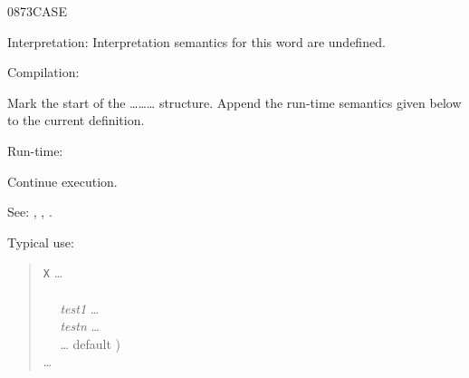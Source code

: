 \begin{newword*}{0873}{CASE}
\item[Interpretation:]
	Interpretation semantics for this word are undefined.

\item[Compilation:]

	Mark the start of the
	\ldots{}\ldots{}\ldots{}
	structure. Append the run-time semantics given below to the
	current definition.

\item[Run-time:]
	\stack{}{}

	Continue execution.

\item[See:]
	,
	,
	.

	\begin{rationale} %
		Typical use:
		\begin{quote}
			\word{:} \texttt{X} {\ldots} \\
			\tab {} \\
			\tab~~ \emph{test1}  {\ldots}  \\
			\tab~~ \emph{testn}  {\ldots}  \\
			\tab~~ {\ldots}  default ) \\
			\tab {} {\ldots} \\
			\word{;}
		\end{quote}
	\end{rationale}
\end{newword*}


